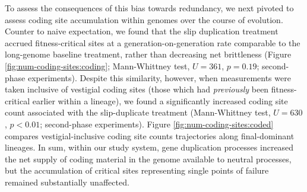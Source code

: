 To assess the consequences of this bias towards redundancy, we next pivoted to assess coding site accumulation within genomes over the course of evolution.
Counter to naive expectation, we found that the slip duplication treatment accrued fitness-critical sites at a generation-on-generation rate comparable to the long-genome baseline treatment, rather than decreasing net brittleness (Figure \ref{fig:num-coding-sites:coding}; Mann-Whittney test, $U=361$, $p=0.19$; second-phase experiments).
Despite this similarity, however, when measurements were taken inclusive of vestigial coding sites (those which had \textit{previously} been fitness-critical earlier within a lineage), we found a significantly increased coding site count associated with the slip-duplicate treatment (Mann-Whittney test, $U=630$, $p<0.01$; second-phase experiments).
Figure \ref{fig:num-coding-sites:coded} compares vestigial-inclusive coding site counts trajectories along final-dominant lineages.
In sum, within our study system, gene duplication processes increased the net supply of coding material in the genome available to neutral processes, but the accumulation of critical sites representing single points of failure remained substantially unaffected.

